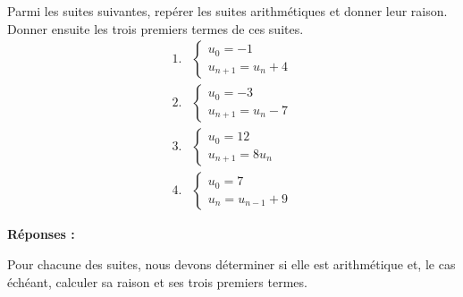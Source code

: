 \documentclass[a4paper,12pt]{article}
\begin{document}
\begin{tcolorbox}[colback=gray!10, colframe=gray!50, title=Exercice \textbf{89}]
  Parmi les suites suivantes, repérer les suites arithmétiques et donner leur raison. Donner ensuite les trois premiers termes de ces suites.
  \[
  \begin{array}{ll}
  1. & \left\{
    \begin{array}{l}
    u_0 = -1 \\
    u_{n+1} = u_n + 4
    \end{array}
    \right. \\
  2. & \left\{
    \begin{array}{l}
    u_0 = -3 \\
    u_{n+1} = u_n - 7
    \end{array}
    \right. \\
  3. & \left\{
    \begin{array}{l}
    u_0 = 12 \\
    u_{n+1} = 8u_n
    \end{array}
    \right. \\
  4. & \left\{
    \begin{array}{l}
    u_0 = 7 \\
    u_n = u_{n-1} + 9
    \end{array}
    \right.
  \end{array}
  \]
  \end{tcolorbox}
  
  \bigskip
  
  \textbf{Réponses :}
  
  Pour chacune des suites, nous devons déterminer si elle est arithmétique et, le cas échéant, calculer sa raison et ses trois premiers termes.
  
\end{document}

